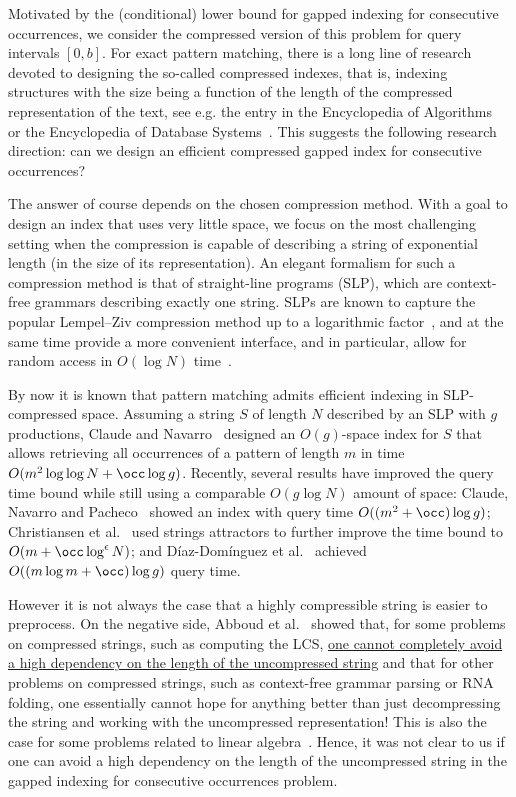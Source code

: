 Motivated by the (conditional) lower bound for gapped indexing for consecutive occurrences, we consider
the compressed version of this problem for query intervals $[0,b]$. For exact pattern matching, there is a long line of research
devoted to designing the so-called compressed indexes, that is, indexing structures with the size being a function of
the length of the compressed representation of the text, see e.g. the entry in the Encyclopedia of Algorithms~\cite{MakinenN16}
or the Encyclopedia of Database Systems~\cite{FerraginaV18}.
This suggests the following research direction: can we design an efficient compressed gapped index for consecutive
occurrences? 

The answer of course depends on the chosen compression method. With a goal to design an index that uses very little space, we focus on the most challenging  setting when the compression is capable of describing a string of exponential length (in the size of its representation). An elegant formalism for such a compression method is that of straight-line programs (SLP), which are context-free grammars describing exactly one string. SLPs are known to capture the popular Lempel--Ziv compression method up to a logarithmic factor~\cite{CharikarLLPPRSS02,Rytter02}, and at the same time provide a more convenient interface, and in particular, allow for random access in $O(\log N)$ time~\cite{random_access_grammar_compress}. 

By now it is known that pattern matching admits efficient indexing in SLP-compressed space. Assuming a string $S$ of length $N$ described by an SLP with $g$ productions, Claude and Navarro~\cite{spire/ClaudeN12a} designed an $O(g)$-space index for $S$ that allows retrieving all occurrences of a pattern of length $m$ in time $O(m^2 \log \log N + \occ \log g)$. 
Recently, several results have improved the query time bound while still using a comparable $O(g\log N)$ amount of space: Claude, Navarro and Pacheco~\cite{DBLP:journals/jcss/ClaudeNP21} showed an index with query time $O((m^2 + \occ)  \log g)$; Christiansen et al.~\cite{talg/ChristiansenEKN21} used strings attractors to further improve the time bound to $O(m + \occ \log^\epsilon N)$; and Díaz-Domínguez et al.~\cite{spire/DNP2021} achieved $O((m \log m +\occ)\log g)$ query time. 

However it is not always the case that a highly compressible string is easier to preprocess.
On the negative side, Abboud et al.~\cite{abboud2017fine} showed that,
for some problems on compressed strings,
such as computing the LCS, \ul{one cannot completely avoid a high dependency on the length of the uncompressed
string} and that for other problems on compressed strings, such as context-free grammar parsing or RNA folding,
one essentially cannot hope for anything better than just decompressing the string and working with the
uncompressed representation! This is also the case for some problems related to linear algebra~\cite{AbboudBBK20}. Hence, it was not clear to us if one can avoid a high dependency on the length of the uncompressed string
in the gapped indexing for consecutive occurrences problem. 

